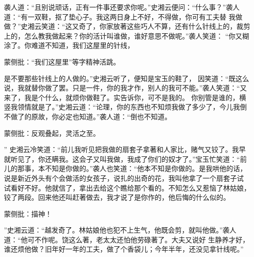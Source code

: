 \begin{parag}


    袭人道：“且别说顽话，正有一件事还要求你呢。”史湘云便问：“什么事？”袭人道：“有一双鞋，抠了垫心子。我这两日身上不好，不得做，你可有工夫替 我做做？”史湘云笑道：“这又奇了，你家放著这些巧人不算，还有什么针线上的，裁剪上的，怎么教我做起来？你的活计叫谁做，谁好意思不做呢。”袭人笑道： “你又糊涂了。你难道不知道，我们这屋里的针线，\begin{note}蒙侧批：“我们这屋里”等字精神活跳。\end{note}是不要那些针线上的人做的。”史湘云听了，便知是宝玉的鞋了， 因笑道：“既这么说，我就替你做了罢。只是一件，你的我才作，别人的我可不能。”袭人笑道：“又来了，我是个什么，就烦你做鞋了。实告诉你，可不是我的。 你别管是谁的，横竖我领情就是了。”史湘云道：“论理，你的东西也不知烦我做了多少了，今儿我倒不做了的原故，你必定也知道。”袭人道：“倒也不知道。\begin{note}蒙侧批：反观叠起，灵活之至。\end{note}” 史湘云冷笑道：“前儿我听见把我做的扇套子拿著和人家比，赌气又铰了。我早就听见了，你还瞒我。这会子又叫我做，我成了你们的奴才了。”宝玉忙笑道：“前 儿的那事，本不知是你做的。”袭人也笑道：“他本不知是你做的。是我哄他的话，说是新近外头有个会做活的女孩子，说扎的出奇的花，我叫他拿了一个扇套子试 试看好不好。他就信了，拿出去给这个瞧给那个看的。不知怎么又惹恼了林姑娘，铰了两段。回来他还叫赶著做去，我才说了是你作的，他后悔的什么似的。\begin{note}蒙侧批：描神！\end{note}”史湘云道：“越发奇了。林姑娘他也犯不上生气，他既会剪，就叫他做。”袭人道：“他可不作呢。饶这么著，老太太还怕他劳碌著了。大夫又说好 生静养才好，谁还烦他做？旧年好一年的工夫，做了个香袋儿；今年半年，还没见拿针线呢。”
\end{parag}


